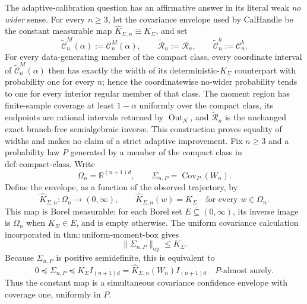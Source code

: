 The adaptive-calibration question has an affirmative answer in its literal weak \emph{no wider} sense.  For every \(n\geq 3\), let the covariance envelope used by \(\mathrm{CalHandle}\) be the constant measurable map \(\widehat K_{\Sigma,n}\equiv K_\Sigma\), and set
\[
 \widetilde{\mathcal C}_n^M(\alpha):=\mathcal C_n^M(\alpha),
 \qquad
 \widetilde{\mathcal R}_n:=\mathcal R_n,
 \qquad
 \widetilde{\mathcal C}_n^h:=\mathcal C_n^h.
\]
For every data-generating member of the compact class, every coordinate interval of \(\widetilde{\mathcal C}_n^M(\alpha)\) then has exactly the width of its deterministic-\(K_\Sigma\) counterpart with probability one for every \(n\); hence the coordinatewise no-wider probability tends to one for every interior regular member of that class.  The moment region has finite-sample coverage at least \(1-\alpha\) uniformly over the compact class, its endpoints are rational intervals returned by \(\operatorname{Out}_N\), and \(\widetilde{\mathcal R}_n\) is the unchanged exact branch-free semialgebraic inverse.  This construction proves equality of widths and makes no claim of a strict adaptive improvement.
Fix \(n\geq3\) and a probability law \(P\) generated by a member of the compact class in \(\mathrm{def{:}compact\mbox{-}class}\).  Write
\[
 \Omega_n=\mathbb R^{(n+1)d},
 \qquad
 \Sigma_{n,P}=\operatorname{Cov}_P(W_n).
\]
Define the envelope, as a function of the observed trajectory, by
\[
 \widehat K_{\Sigma,n}:\Omega_n\longrightarrow(0,\infty),
 \qquad
 \widehat K_{\Sigma,n}(w)=K_\Sigma
 \quad\text{for every }w\in\Omega_n.
\]
This map is Borel measurable: for each Borel set \(E\subseteq(0,\infty)\), its inverse image is \(\Omega_n\) when \(K_\Sigma\in E\), and is empty otherwise.  The uniform covariance calculation incorporated in \(\mathrm{thm{:}uniform\mbox{-}moment\mbox{-}box}\) gives
\[
 \|\Sigma_{n,P}\|_{\mathrm{op}}\leq K_\Sigma.
\]
Because \(\Sigma_{n,P}\) is positive semidefinite, this is equivalent to
\[
 0\preceq\Sigma_{n,P}\preceq K_\Sigma I_{(n+1)d}
 =\widehat K_{\Sigma,n}(W_n)I_{(n+1)d}
 \quad P\text{-almost surely}.
\]
Thus the constant map is a simultaneous covariance confidence envelope with coverage one, uniformly in \(P\).

